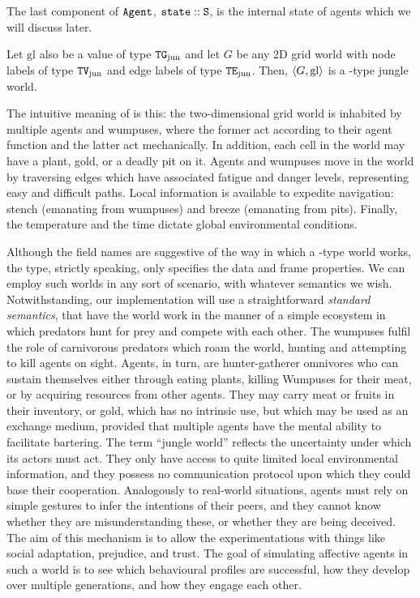 \begin{definition}[\wjun]
The last component of $\mathtt{Agent}$, $\mathtt{state} :: \mathtt{S}$, is the internal state of agents which we will discuss later.

Let $\mathrm{gl}$ also be a value of type $\mathtt{TG}_{\mathrm{jun}}$ and let $G$ be any 2D grid world with node labels of type $\mathtt{TV}_{\mathrm{jun}}$ and edge labels of type $\mathtt{TE}_{\mathrm{jun}}$. Then, $\langle G, \mathrm{gl} \rangle$ is a \wjun-type jungle world.
\end{definition}

The intuitive meaning of \wjun is this: the two-dimensional grid world is inhabited by multiple agents and wumpuses, where the former act according to their agent function and the latter act mechanically. In addition, each cell in the world may have a plant, gold, or a deadly pit on it. Agents and wumpuses move in the world by traversing edges which have associated fatigue and danger levels, representing easy and difficult paths. Local information is available to expedite navigation: stench (emanating from wumpuses) and breeze (emanating from pits). Finally, the temperature and the time dictate global environmental conditions.

Although the field names are suggestive of the way in which a \wjun-type world works, the type, strictly speaking, only specifies the data and frame properties. We can employ such worlds in any sort of scenario, with whatever semantics we wish. Notwithstanding, our implementation will use a straightforward {\em standard semantics}, that have the world work in the manner of a simple ecosystem in which predators hunt for prey and compete with each other. The wumpuses fulfil the role of carnivorous predators which roam the world, hunting and attempting to kill agents on sight. Agents, in turn, are hunter-gatherer omnivores who can sustain themselves either through eating plants, killing Wumpuses for their meat, or by acquiring resources from other agents. They may carry meat or fruits in their inventory, or gold, which has no intrinsic use, but which may be used as an exchange medium, provided that multiple agents have the mental ability to facilitate bartering. The term ``jungle world'' reflects the uncertainty under which its actors must act. They only have access to quite limited local environmental information, and they possess no communication protocol upon which they could base their cooperation. Analogously to real-world situations, agents must rely on simple gestures to infer the intentions of their peers, and they cannot know whether they are misunderstanding these, or whether they are being deceived. The aim of this mechanism is to allow the experimentations with things like social adaptation, prejudice, and trust. The goal of simulating affective agents in such a world is to see which behavioural profiles are successful, how they develop over multiple generations, and how they engage each other.

